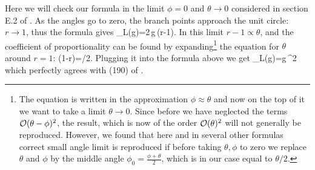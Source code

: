 Here we will check our formula  in the limit $\phi=0$ and $\theta\rightarrow 0$ considered in section E.2 of \cite{Gromov:2012eu}. As the angles go to zero, the branch points approach the unit circle: $r\rightarrow 1$, thus the formula  gives
\beq
	\Gamma_L(g)=2\,g\,\theta (r-1)\cos\psi.
\eeq
In this limit $r-1\propto\theta$, and the coefficient of proportionality can be found by expanding\footnote{The equation  is written in the approximation $\phi\approx\theta$ and now on the top of it we want to take a limit $\theta\rightarrow 0$. Since before we have neglected the terms ${\cal O}(\theta-\phi)^2$, the result, which is now of the order ${\cal O}(\theta)^2$ will not generally be reproduced. However, we found that here and in several other formulas correct small angle limit is reproduced if before taking $\theta,\phi$ to zero we replace $\theta$ and $\phi$ by the middle angle $\phi_0=\frac{\phi+\theta}{2}$, which is in our case equal to $\theta/2$.} the equation  for $\theta$ around $r=1$:
 (1-r)=\theta/2.
\eeq
Plugging it into the formula above we get
\beq
\Gamma_L(g)=g\,\theta^2 \,
\eeq
which perfectly agrees with (190) of \cite{Gromov:2012eu}.

